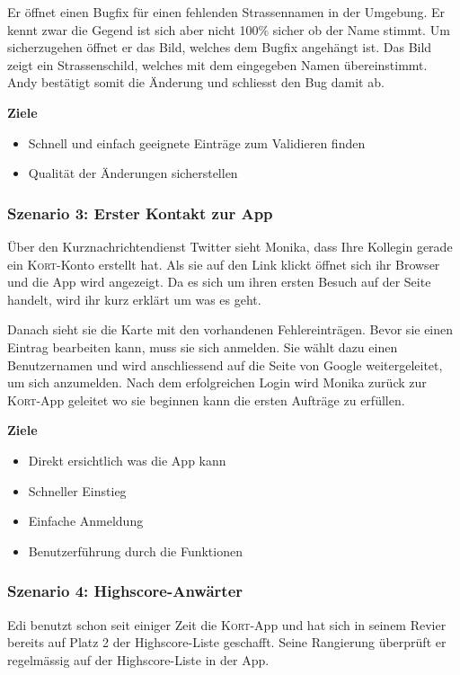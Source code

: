 Er öffnet einen Bugfix für einen fehlenden Strassennamen in der Umgebung. Er kennt zwar die Gegend ist sich aber nicht 100\% sicher ob der Name stimmt. Um sicherzugehen öffnet er das Bild, welches dem Bugfix angehängt ist. Das Bild zeigt ein Strassenschild, welches mit dem eingegeben Namen übereinstimmt. Andy bestätigt somit die Änderung und schliesst den Bug damit ab.

\textbf{Ziele}
\begin{itemize}
\item Schnell und einfach geeignete Einträge zum Validieren finden
\item Qualität der Änderungen sicherstellen
\end{itemize}

\subsubsection{Szenario 3: Erster Kontakt zur App}

Über den Kurznachrichtendienst Twitter sieht Monika, dass Ihre Kollegin gerade ein \textsc{Kort}-Konto erstellt hat.
Als sie auf den Link klickt öffnet sich ihr Browser und die App wird angezeigt.
Da es sich um ihren ersten Besuch auf der Seite handelt, wird ihr kurz erklärt um was es geht.

Danach sieht sie die Karte mit den vorhandenen Fehlereinträgen.
Bevor sie einen Eintrag bearbeiten kann, muss sie sich anmelden.
Sie wählt dazu einen Benutzernamen und wird anschliessend auf die Seite von Google weitergeleitet, um sich anzumelden.
Nach dem erfolgreichen Login wird Monika zurück zur \textsc{Kort}-App geleitet wo sie beginnen kann die ersten Aufträge zu erfüllen.

\textbf{Ziele}
\begin{itemize}
\item Direkt ersichtlich was die App kann
\item Schneller Einstieg
\item Einfache Anmeldung
\item Benutzerführung durch die Funktionen
\end{itemize}

\subsubsection{Szenario 4: Highscore-Anwärter}

Edi benutzt schon seit einiger Zeit die \textsc{Kort}-App und hat sich in seinem Revier bereits auf Platz 2 der Highscore-Liste geschafft.
Seine Rangierung überprüft er regelmässig auf der Highscore-Liste in der App.

